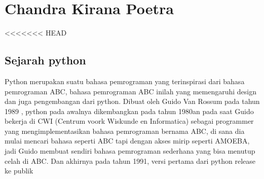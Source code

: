 \section{Chandra Kirana Poetra}

<<<<<<< HEAD
\subsection{Sejarah python}

\begin{flushleft}
\qquad Python merupakan suatu bahasa pemrograman yang terinspirasi dari bahasa pemrograman ABC, bahasa pemrograman ABC inilah yang memengaruhi design dan juga pengembangan dari python. Dibuat oleh Guido Van Rossum pada tahun 1989 , python pada awalnya dikembangkan pada tahun 1980an pada saat Guido bekerja di CWI (Centrum voork Wiskunde en Informatica) sebagai programmer yang mengimplementasikan bahasa pemrograman bernama ABC, di sana dia mulai mencari bahasa seperti ABC tapi dengan akses mirip seperti AMOEBA, jadi Guido membuat sendiri bahasa pemrograman sederhana yang bisa menutup celah di ABC. Dan akhirnya pada tahun 1991, versi pertama dari python release ke publik
\end{flushleft}

